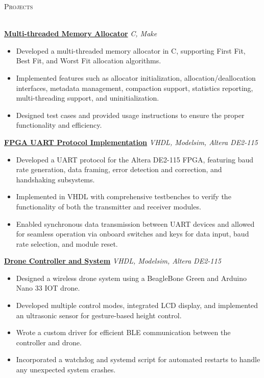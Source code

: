 \documentclass[a4paper]{article}
\newcommand{\lineunder} {
    \vspace*{-8pt} \\
    \hspace*{-18pt} \hrulefill \\
}
\newcommand{\header} [1] {
    {\hspace*{-18pt}\vspace*{6pt} \textsc{#1}}
    \vspace*{-6pt} \lineunder
}
\begin{document}
\header{Projects}
\vspace{1mm}

\href{https://github.com/SatireSage/Multi-threaded-Memory-Allocator}{\textbf{Multi-threaded Memory Allocator}} {\sl C, Make}
\vspace{-2mm}
\begin{itemize} \itemsep -3pt
    \item Developed a multi-threaded memory allocator in C, supporting First Fit, Best Fit, and Worst Fit allocation algorithms.
    \item Implemented features such as allocator initialization, allocation/deallocation interfaces, metadata management, compaction support, statistics reporting, multi-threading support, and uninitialization.
    \item Designed test cases and provided usage instructions to ensure the proper functionality and efficiency.
\end{itemize}

\href{https://github.com/SatireSage/FPGA-UART-Protocol}{\textbf{FPGA UART Protocol Implementation}} {\sl VHDL, Modelsim, Altera DE2-115}
\vspace{-2mm}
\begin{itemize} \itemsep -3pt
    \item Developed a UART protocol for the Altera DE2-115 FPGA, featuring baud rate generation, data framing, error detection and correction, and handshaking subsystems.
    \item Implemented in VHDL with comprehensive testbenches to verify the functionality of both the transmitter and receiver modules.
    \item Enabled synchronous data transmission between UART devices and allowed for seamless operation via onboard switches and keys for data input, baud rate selection, and module reset.
\end{itemize}

\href{https://github.com/SatireSage/Dronee}{\textbf{Drone Controller and System}} {\sl VHDL, Modelsim, Altera DE2-115}
\vspace{-2mm}
\begin{itemize} \itemsep -3pt
    \item Designed a wireless drone system using a BeagleBone Green and Arduino Nano 33 IOT drone.
    \item Developed multiple control modes, integrated LCD display, and implemented an ultrasonic sensor for gesture-based height control.
    \item Wrote a custom driver for efficient BLE communication between the controller and drone.
    \item Incorporated a watchdog and systemd script for automated restarts to handle any unexpected system crashes.
\end{itemize}
\end{document}
